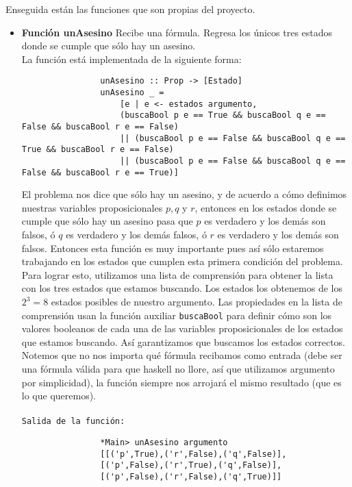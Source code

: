 \documentclass[letterpaper,12pt]{article}
\begin{document}
\begin{itemize}
        Enseguida están las funciones que son propias del proyecto.

        \begin{itemize}
            \item \textbf{Función unAsesino} Recibe una fórmula. Regresa los
            únicos tres estados donde se cumple que sólo hay un asesino. \\
            La función está implementada de la siguiente forma:
            \begin{lstlisting}
                unAsesino :: Prop -> [Estado]
                unAsesino _ = 
                    [e | e <- estados argumento, 
                    (buscaBool p e == True && buscaBool q e == False && buscaBool r e == False)
                    || (buscaBool p e == False && buscaBool q e == True && buscaBool r e == False)
                    || (buscaBool p e == False && buscaBool q e == False && buscaBool r e == True)]
            \end{lstlisting}

            El problema nos dice que sólo hay un asesino, y de acuerdo a cómo 
            definimos nuestras variables proposicionales $p, q$ y $r$, entonces 
            en los estados donde se cumple que sólo hay un asesino pasa que $p$
            es verdadero y los demás son falsos, ó $q$ es verdadero y los demás
            falsos, ó $r$ es verdadero y los demás son falsos. Entonces esta 
            función es muy importante pues así sólo estaremos trabajando en los 
            estados que cumplen esta primera condición del problema. \\
            Para lograr esto, utilizamos una lista de comprensión para obtener
            la lista con los tres estados que estamos buscando. Los estados los
            obtenemos de los $2^{3} = 8$ estados posibles de nuestro argumento. 
            Las propiedades en la lista de comprensión usan la función auxiliar 
            \texttt{buscaBool} para definir cómo son los valores booleanos de 
            cada una de las variables proposicionales de los estados que 
            estamos buscando. Así garantizamos que buscamos los estados 
            correctos. \\
            Notemos que no nos importa qué fórmula recibamos como entrada 
            (debe ser una fórmula válida para que haskell no llore, así que 
            utilizamos argumento por simplicidad), la función siempre nos 
            arrojará el mismo resultado (que es lo que queremos). \\ \\
            \texttt{Salida de la función:}
            \begin{lstlisting}
                *Main> unAsesino argumento
                [[('p',True),('r',False),('q',False)],
                [('p',False),('r',True),('q',False)],
                [('p',False),('r',False),('q',True)]]
            \end{lstlisting}


\end{itemize}
\end{itemize}
\end{document}
